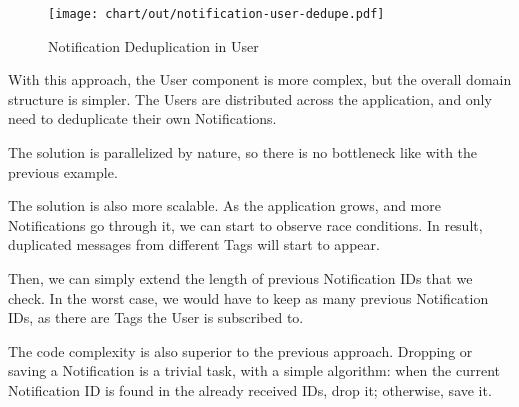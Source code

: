 \begin{figure}[h]
  \centering
  \texttt{[image: chart/out/notification-user-dedupe.pdf]}
  \caption{Notification Deduplication in User}
  \label{fig:notification-user-dedupe}
\end{figure}

With this approach,
the User component is more complex,
but the overall domain structure is simpler.
The Users are distributed across the application,
and only need to deduplicate their own Notifications.

The solution is parallelized by nature,
so there is no bottleneck
like with the previous example.

The solution is also more scalable.
As the application grows,
and more Notifications go through it,
we can start to observe race conditions.
In result,
duplicated messages from different Tags
will start to appear.

Then, we can simply extend the length of
previous Notification IDs that we check.
In the worst case,
we would have to keep as many previous
Notification IDs,
as there are Tags the User is subscribed to.

The code complexity is also superior
to the previous approach.
Dropping or saving a Notification is a trivial task,
with a simple algorithm:
when the current Notification ID is found in the
already received IDs, drop it; otherwise, save it.
